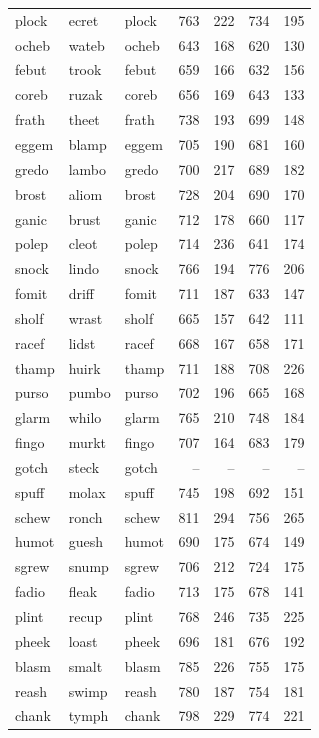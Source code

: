 \documentclass[
]{interact}
\begin{document}
\begin{longtable*}{lllrrrr}
plock & ecret & plock & 763 & 222 & 734 & 195 \\ 
ocheb & wateb & ocheb & 643 & 168 & 620 & 130 \\ 
febut & trook & febut & 659 & 166 & 632 & 156 \\ 
coreb & ruzak & coreb & 656 & 169 & 643 & 133 \\ 
frath & theet & frath & 738 & 193 & 699 & 148 \\ 
eggem & blamp & eggem & 705 & 190 & 681 & 160 \\ 
gredo & lambo & gredo & 700 & 217 & 689 & 182 \\ 
brost & aliom & brost & 728 & 204 & 690 & 170 \\ 
ganic & brust & ganic & 712 & 178 & 660 & 117 \\ 
polep & cleot & polep & 714 & 236 & 641 & 174 \\ 
snock & lindo & snock & 766 & 194 & 776 & 206 \\ 
fomit & driff & fomit & 711 & 187 & 633 & 147 \\ 
sholf & wrast & sholf & 665 & 157 & 642 & 111 \\ 
racef & lidst & racef & 668 & 167 & 658 & 171 \\ 
thamp & huirk & thamp & 711 & 188 & 708 & 226 \\ 
purso & pumbo & purso & 702 & 196 & 665 & 168 \\ 
glarm & whilo & glarm & 765 & 210 & 748 & 184 \\ 
fingo & murkt & fingo & 707 & 164 & 683 & 179 \\ 
gotch & steck & gotch & – & – & – & – \\ 
spuff & molax & spuff & 745 & 198 & 692 & 151 \\ 
schew & ronch & schew & 811 & 294 & 756 & 265 \\ 
humot & guesh & humot & 690 & 175 & 674 & 149 \\ 
sgrew & snump & sgrew & 706 & 212 & 724 & 175 \\ 
fadio & fleak & fadio & 713 & 175 & 678 & 141 \\ 
plint & recup & plint & 768 & 246 & 735 & 225 \\ 
pheek & loast & pheek & 696 & 181 & 676 & 192 \\ 
blasm & smalt & blasm & 785 & 226 & 755 & 175 \\ 
reash & swimp & reash & 780 & 187 & 754 & 181 \\ 
chank & tymph & chank & 798 & 229 & 774 & 221 \\ 

\end{longtable*}
\end{document}
